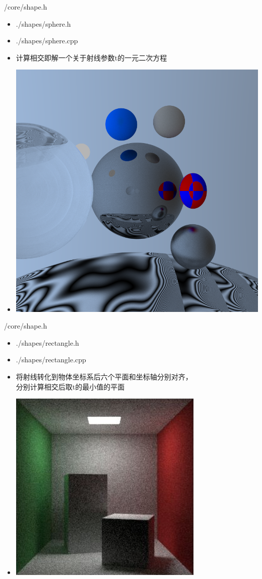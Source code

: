 \documentclass{beamer}
\begin{document}
\begin{frame} {/core/shape.h}
\begin{itemize}
\item ./shapes/sphere.h
\item ./shapes/sphere.cpp
\item 计算相交即解一个关于射线参数t的一元二次方程
\item \includegraphics[scale=0.20]{spheres}
\end{itemize}
\end{frame}

\begin{frame} {/core/shape.h}
\begin{itemize}
\item ./shapes/rectangle.h
\item ./shapes/rectangle.cpp
\item 将射线转化到物体坐标系后六个平面和坐标轴分别对齐，\\ 分别计算相交后取t的最小值的平面
\item \includegraphics[scale=0.40]{rect}
\end{itemize}
\end{frame}
\end{document}

